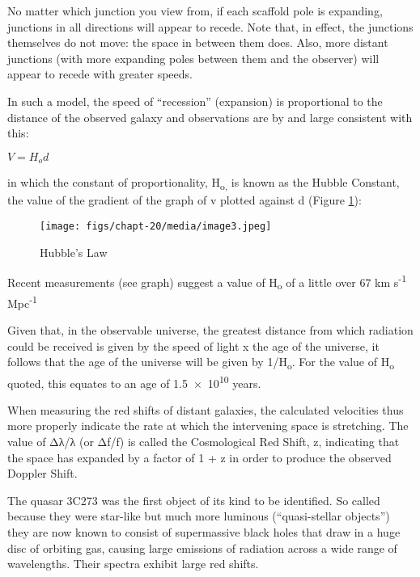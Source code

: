 \documentclass[revision-guide.tex]{subfiles}
\begin{document}
No matter which junction you view from, if each scaffold pole is
expanding, junctions in all directions will appear to recede. Note that,
in effect, the junctions themselves do not move: the space in between
them does. Also, more distant junctions (with more expanding poles
between them and the observer) will appear to recede with greater
speeds.

In such a model, the speed of ``recession'' (expansion) is proportional
to the distance of the observed galaxy and observations are by and large
consistent with this:

$ V = H_{o} d$

in which the constant of proportionality, H\textsubscript{o,} is known
as the Hubble Constant, the value of the gradient of the graph of v
plotted against d (Figure \ref{hubble-law}):

\begin{figure}[h]
\texttt{[image: figs/chapt-20/media/image3.jpeg]}
\caption{Hubble's Law}
\label{hubble-law}
\end{figure}

Recent measurements (see graph) suggest a value of H\textsubscript{o} of
a little over 67 km s\textsuperscript{-1} Mpc\textsuperscript{-1}

Given that, in the observable universe, the greatest distance from which
radiation could be received is given by the speed of light x the age of
the universe, it follows that the age of the universe will be given by
1/H\textsubscript{o}. For the value of H\textsubscript{o} quoted, this
equates to an age of \num{1.5e10} years.

When measuring the red shifts of distant galaxies, the calculated
velocities thus more properly indicate the rate at which the intervening
space is stretching. The value of Δλ/λ (or Δf/f) is called the
Cosmological Red Shift, z, indicating that the space has expanded by a
factor of 1 + z in order to produce the observed Doppler Shift.


The quasar 3C273 was the first object of its kind to be identified. So
called because they were star-like but much more luminous
(``quasi-stellar objects'') they are now known to consist of
supermassive black holes that draw in a huge disc of orbiting gas,
causing large emissions of radiation across a wide range of wavelengths.
Their spectra exhibit large red shifts.
\end{document}
